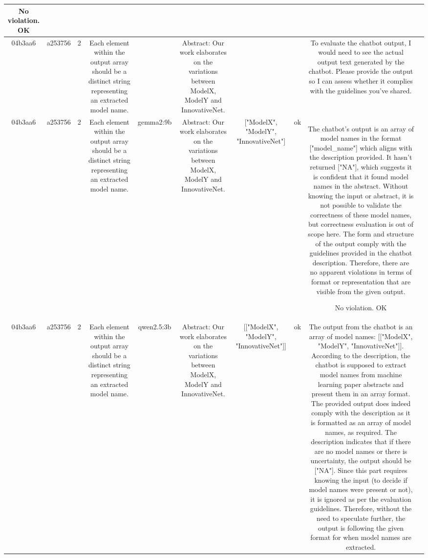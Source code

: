 \begin{table}[h!]
\begin{tabular}{|c|c|c|c|c|c|c|c|c|c|}
No violation.
OK & \\
\hline
04b3aa6 & a253756 & 2 & Each element within the output array should be a distinct string representing an extracted model name. &  & Abstract: Our work elaborates on the variations between ModelX, ModelY and InnovativeNet. &  &  & To evaluate the chatbot output, I would need to see the actual output text generated by the chatbot. Please provide the output so I can assess whether it complies with the guidelines you've shared. & \\
\hline
04b3aa6 & a253756 & 2 & Each element within the output array should be a distinct string representing an extracted model name. & gemma2:9b & Abstract: Our work elaborates on the variations between ModelX, ModelY and InnovativeNet. & ["ModelX", "ModelY", "InnovativeNet"] 
 & ok & The chatbot's output is an array of model names in the format ["model_name"] which aligns with the description provided. It hasn't returned ["NA"], which suggests it is confident that it found model names in the abstract. Without knowing the input or abstract, it is not possible to validate the correctness of these model names, but correctness evaluation is out of scope here. The form and structure of the output comply with the guidelines provided in the chatbot description. Therefore, there are no apparent violations in terms of format or representation that are visible from the given output.

No violation.
OK & \\
\hline
04b3aa6 & a253756 & 2 & Each element within the output array should be a distinct string representing an extracted model name. & qwen2.5:3b & Abstract: Our work elaborates on the variations between ModelX, ModelY and InnovativeNet. & [["ModelX", "ModelY", "InnovativeNet"]] & ok & The output from the chatbot is an array of model names: [["ModelX", "ModelY", "InnovativeNet"]]. According to the description, the chatbot is supposed to extract model names from machine learning paper abstracts and present them in an array format. The provided output does indeed comply with the description as it is formatted as an array of model names, as required. The description indicates that if there are no model names or there is uncertainty, the output should be ["NA"]. Since this part requires knowing the input (to decide if model names were present or not), it is ignored as per the evaluation guidelines. Therefore, without the need to speculate further, the output is following the given format for when model names are extracted.


\end{tabular}
\end{table}
